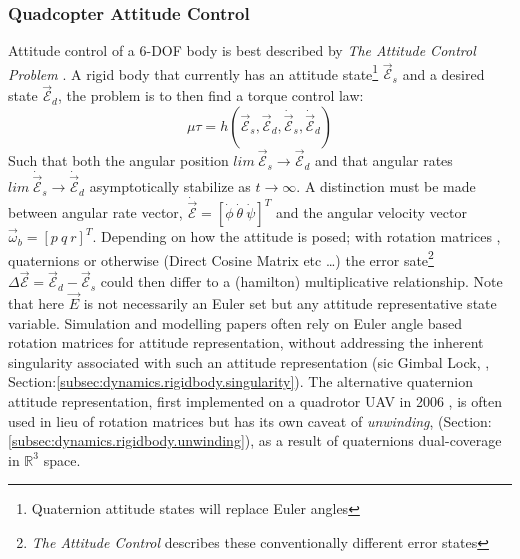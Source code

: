 \subsubsection*{Quadcopter Attitude Control}
Attitude control of a 6-DOF body is best described by \emph{The Attitude Control Problem} \cite{attitudecontrolproblem}. A rigid body that currently has an attitude state\footnote{Quaternion attitude states will replace Euler angles} $\vec{\mathcal{E}}_s$ and a desired state $\vec{\mathcal{E}}_d$, the problem is to then find a torque control law:
\begin{equation} \label{eq:2}
\mu\tau = h(\vec{\mathcal{E}}_s,\vec{\mathcal{E}}_d,\dot{\vec{\mathcal{E}}}_s,\dot{\vec{\mathcal{E}}}_d)
\end{equation}
Such that both the angular position $lim~\vec{\mathcal{E}}_s \rightarrow \vec{\mathcal{E}}_d$ and that angular rates $lim~\dot{\vec{\mathcal{E}}}_s \rightarrow \dot{\vec{\mathcal{E}}}_d$ asymptotically stabilize as $t \rightarrow \infty$. A distinction must be made between angular rate vector, $\dot{\vec{\mathcal{E}}}=[\dot{\phi}~\dot{\theta}~\dot{\psi}]^T$ and the angular velocity vector $\vec{\omega}_b=[p~q~r]^T$. Depending on how the attitude is posed; with rotation matrices \cite{rigidbodylecture,eulerrigidbody,rotationsequences}, quaternions \cite{quaterniondynamics, rotationsequences, spacecraftattitutdequaternions,fullquaternion} or otherwise (Direct Cosine Matrix etc \ldots) the error sate\footnote{\emph{The Attitude Control} \cite{attitudecontrolproblem} describes these conventionally different error states} $\Delta\vec{\mathcal{E}}= \vec{\mathcal{E}}_d - \vec{\mathcal{E}}_s$ could then differ to a (hamilton) multiplicative relationship. Note that here $\vec{E}$ is not necessarily an Euler set but any attitude representative state variable. Simulation and modelling papers often rely on Euler angle based rotation matrices for attitude representation, \cite{adaptivedisturbancecontrol, optimizedpidquadcopter, singleaxistilting, backsteppingquadcoptercontrol, fullquadcoptercontrol} without addressing the inherent singularity associated with such an attitude representation (sic Gimbal Lock, \cite{euleranglesingularity}, Section:\ref{subsec:dynamics.rigidbody.singularity}). The alternative quaternion attitude representation, first implemented on a quadrotor UAV in 2006 \cite{attitudestabilization}, is often used in lieu of rotation matrices but has its own caveat of \emph{unwinding}, (Section:\ref{subsec:dynamics.rigidbody.unwinding}), as a result of quaternions dual-coverage \cite{unwinding} in $\mathbb{R}^3$ space.
